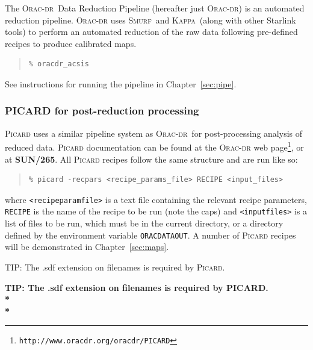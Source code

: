 \documentclass[twoside,11pt]{article}
\newcommand{\htmladdnormallinkfoot}[2]{#1\footnote{#2}}
\newcommand{\htmladdnormallink}[2]{#1}
\newcommand{\htmlref}[2]{#1}
\newenvironment{latexonly}{}{}
\newcommand{\latexhtml}[2]{#1}
\newcommand{\xref}[3]{#1}
\renewcommand{\_}{\texttt{\symbol{95}}}
\newenvironment{fmpage}[1]{\begin{lrbox}{\fmbox}\begin{minipage}{#1}}{\end{minipage}\end{lrbox}\fbox{\usebox{\fmbox}}}
\newenvironment{myquote}{
   \color{MidnightBlue}\begin{quote}\begin{small}}{
   \end{small}\end{quote}
}
\newcommand{\Kappa}{\xref{\textsc{Kappa}}{sun95}{}}
\newcommand{\oracdr}{\htmladdnormallink{\textsc{Orac-dr}}{http://www.oracdr.org/oracdr}}
\newcommand{\smurf}{\xref{\textsc{Smurf}}{sun258}{}}
\newcommand{\param}[1]{\texttt{#1}}
\newcommand{\envvar}[1]{\texttt{#1}}
\newcommand{\url}[1]{\texttt{#1}}
\newcommand{\picardsun}{\xref{\textbf{SUN/265}}{sun265}{}}
\newcommand{\cref}[3]{\latexhtml{#1~\ref{#2}}{\htmlref{#3}{#2}}}
\renewenvironment{myquote}{
      \begin{quote}\begin{small}}{
      \end{small}\end{quote}
   }
\begin{document}
The \oracdr\ Data Reduction Pipeline \cite{oracdr} (hereafter just
\textsc{Orac-dr}) is an automated reduction pipeline. \textsc{Orac-dr} uses
\smurf\ and \Kappa\ (along with other Starlink tools) to perform an automated
reduction of the raw data following pre-defined recipes to produce
calibrated maps.
\begin{myquote}
\begin{verbatim}
% oracdr_acsis
\end{verbatim}
\end{myquote}
See instructions for running the pipeline in
\cref{Chapter}{sec:pipe}{The SCUBA-2 Pipeline}.

\subsubsection{PICARD for post-reduction processing}

\textsc{Picard} uses a similar pipeline system as \oracdr\ for
post-processing analysis of reduced data. \textsc{Picard}
documentation can be found at \htmladdnormallinkfoot{the
\textsc{Orac-dr} web page}{\url{http://www.oracdr.org/oracdr/PICARD}}, or at
\picardsun. All \textsc{Picard} recipes follow the same structure and
are run like so:
\begin{myquote}
\begin{verbatim}
% picard -recpars <recipe_params_file> RECIPE <input_files>
\end{verbatim}
\end{myquote}
where \param{<recipe\_param\_file>} is a text file containing the
relevant recipe parameters, \param{RECIPE} is the name of the recipe
to be run (note the caps) and \param{<input\_files>} is a list of
files to be run, which must be in the current directory, or a
directory defined by the environment variable \envvar{ORAC\_DATA\_OUT}. A
number of \textsc{Picard}
recipes will be demonstrated in \cref{Chapter}{sec:maps}{Reducing your data}.


\begin{latexonly}
\begin{center}
\begin{fmpage}{0.95\linewidth}
\vspace{0.1cm}
TIP: The .sdf extension on filenames is required by \textsc{Picard}.
\end{fmpage}
\end{center}
\end{latexonly}

\begin{htmlonly}
\textbf{TIP: The .sdf extension on filenames is required by PICARD.\\*\\*}
\end{htmlonly}
\end{document}
